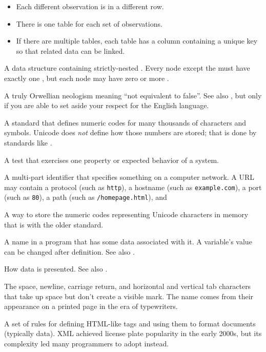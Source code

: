 \begin{description}
\begin{itemize}
\item
  Each different observation is in a different row.

\item
  There is one table for each set of observations.

\item
  If there are multiple tables,
  each table has a column containing a unique key
  so that related data can be linked.
\end{itemize}

A data structure containing strictly-nested . Every node
except the  must have exactly one , but each node may have zero or more
.

A truly Orwellian neologism meaning ``not equivalent to false''. See also
, but only if you are able to set aside your respect for the
English language.

A standard that defines numeric codes for many thousands of characters and
symbols. Unicode does \emph{not} define how those numbers are stored; that is done
by standards like .

A test that exercises one property or expected behavior of a system.

A multi-part identifier that specifies something on a computer network. A URL
may contain a protocol (such as \texttt{http}), a hostname (such as \texttt{example.com}), a
port (such as \texttt{80}), a path (such as \texttt{/homepage.html}), and 

A way to store the numeric codes representing Unicode characters in memory
that is  with the older
 standard.

A name in a program that has some data associated with it. A variable's value
can be changed after definition. See also .

How data is presented.
See also .

The space, newline, carriage return, and horizontal and vertical tab characters
that take up space but don't create a visible mark.  The name comes from their
appearance on a printed page in the era of typewriters.

A set of rules for defining HTML-like tags and using them to format documents
(typically data). XML achieved license plate popularity in the early 2000s,
but its complexity led many programmers to adopt  instead.

\end{description}
